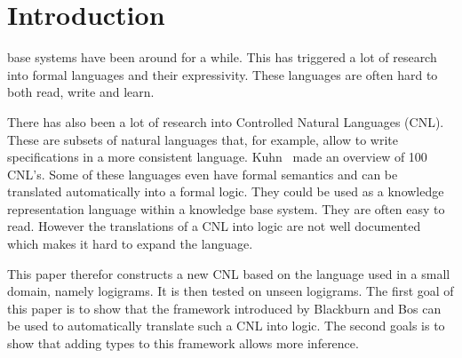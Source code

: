 \section{Introduction}

 base systems have been around for a while. This has triggered a lot of research into formal languages and their expressivity. These languages are often hard to both read, write and learn.

There has also been a lot of research into Controlled Natural Languages (CNL). These are subsets of natural languages that, for example, allow to write specifications in a more consistent language. Kuhn~\cite{Kuhn2014} made an overview of 100 CNL's. Some of these languages even have formal semantics and can be translated automatically into a formal logic. They could be used as a knowledge representation language within a knowledge base system. They are often easy to read. However the translations of a CNL into logic are not well documented which makes it hard to expand the language.

This paper therefor constructs a new CNL based on the language used in a small domain, namely logigrams. It is then tested on unseen logigrams. The first goal of this paper is to show that the framework introduced by Blackburn and Bos \cite{Blackburn2005, Blackburn2006} can be used to automatically translate such a CNL into logic. The second goals is to show that adding types to this framework allows more inference.
